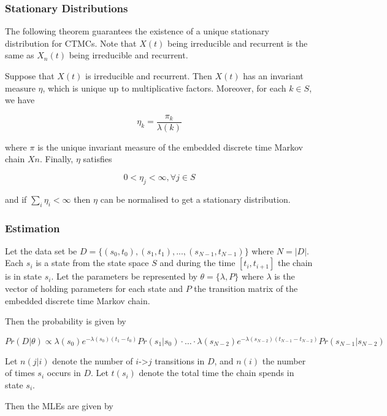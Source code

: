 \documentclass[
  nojss]{jss}
\begin{document}
\hypertarget{stationary-distributions}{%
\subsubsection{Stationary Distributions}\label{stationary-distributions}}

The following theorem guarantees the existence of a unique stationary distribution for CTMCs. Note that \(X(t)\) being irreducible and recurrent is the same as \(X_n(t)\) being irreducible and recurrent.

Suppose that \(X(t)\) is irreducible and recurrent. Then \(X(t)\) has an invariant measure \(\eta\), which is unique up to multiplicative factors. Moreover, for each \(k \in S\), we have

\[\eta_k = \frac{\pi_k}{\lambda(k)}\]

where \(\pi\) is the unique invariant measure of the embedded discrete time Markov chain \(Xn\). Finally, \(\eta\) satisfies

\[0 < \eta_j < \infty, \forall j \in S\]

and if \(\sum_i \eta_i < \infty\) then \(\eta\) can be normalised to get a stationary distribution.

\hypertarget{estimation-1}{%
\subsubsection{Estimation}\label{estimation-1}}

Let the data set be \(D = \{(s_0, t_0), (s_1, t_1), ..., (s_{N-1}, t_{N-1})\}\) where \(N=|D|\). Each \(s_i\) is a state from the state space \(S\) and during the time \([t_i,t_{i+1}]\) the chain is in state \(s_i\). Let the parameters be represented by \(\theta = \{\lambda, P\}\) where \(\lambda\) is the vector of holding parameters for each state and \(P\) the transition matrix of the embedded discrete time Markov chain.

Then the probability is given by

\[
{Pr(D | \theta) \propto \lambda(s_0)e^{-\lambda(s_0)(t_1-t_0)}Pr(s_1|s_0) \cdot\ldots\cdot \lambda(s_{N-2})e^{-\lambda(s_{N-2})(t_{N-1}-t_{N-2})}Pr(s_{N-1}|s_{N-2})}
\]

Let \(n(j|i)\) denote the number of \(i\)-\textgreater{}\(j\) transitions in \(D\), and \(n(i)\) the number of times \(s_i\) occurs in \(D\). Let \(t(s_i)\) denote the total time the chain spends in state \(s_i\).

Then the MLEs are given by
\end{document}
